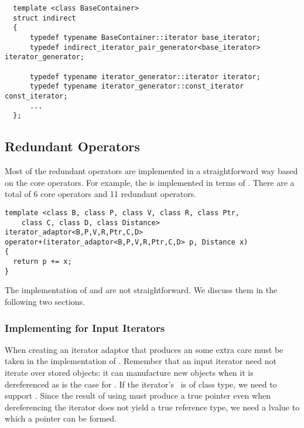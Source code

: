 \documentclass{netobjectdays}
\newcommand{\valuetype}{\code{value\_\-type}}
\begin{document}

{\footnotesize
\begin{verbatim}
  template <class BaseContainer>
  struct indirect
  {
      typedef typename BaseContainer::iterator base_iterator;
      typedef indirect_iterator_pair_generator<base_iterator> iterator_generator;

      typedef typename iterator_generator::iterator iterator;
      typedef typename iterator_generator::const_iterator const_iterator;
      ...
  };
\end{verbatim}
}

\subsection{Redundant Operators}

Most of the redundant operators are implemented in a straightforward
way based on the core operators. For example, the  is
implemented in terms of . There are a total of 6 core
operators and 11 redundant operators.

{\footnotesize
\begin{verbatim}
template <class B, class P, class V, class R, class Ptr,
    class C, class D, class Distance>
iterator_adaptor<B,P,V,R,Ptr,C,D>
operator+(iterator_adaptor<B,P,V,R,Ptr,C,D> p, Distance x)
{
  return p += x;
}
\end{verbatim}
}

The implementation of  and are not
straightforward. We discuss them in the following two sections.

\subsubsection{Implementing  for Input Iterators}
\label{sec:operator-arrow}

When creating an iterator adaptor that produces an
 some extra care must be taken in the
implementation of . Remember that an input iterator
need not iterate over stored objects: it can manufacture new objects
when it is dereferenced as is the case for
. If the iterator's \valuetype\ is of
class type, we need to support . Since the result of
using  must produce a true pointer even when
dereferencing the iterator does not yield a true reference type, we
need a  lvalue to which a pointer can be formed.
\end{document}
